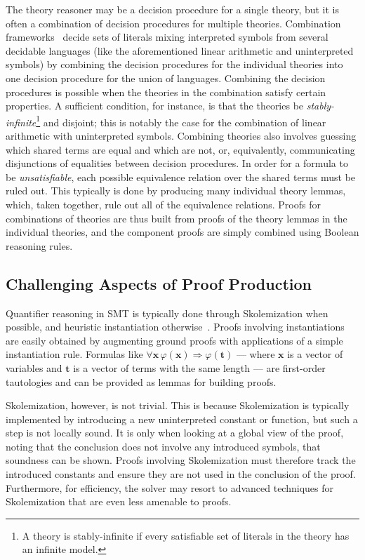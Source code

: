 \documentclass{llncs}
\begin{document}
The theory reasoner may be a decision procedure for a single theory, but it is often a
combination of decision procedures for multiple theories.  Combination
frameworks~\cite{Nelson3,Tinelli1} decide  sets of
literals mixing interpreted symbols from several decidable languages (like the
aforementioned linear arithmetic and uninterpreted symbols) by combining the
decision procedures for the individual theories into one decision
procedure for the union of languages.  Combining the decision procedures is possible
when the theories in the combination satisfy certain properties.  A sufficient
condition, for instance, is that the theories be \emph{stably-infinite}\footnote{A theory
  is stably-infinite if every satisfiable set of literals in the theory has an
  infinite model.} and disjoint; this is notably the case for the combination
of linear arithmetic with uninterpreted symbols.  Combining theories also
involves guessing which shared terms are equal and which are not, or,
equivalently, communicating disjunctions of equalities between decision
procedures.  In order for a formula to be \emph{unsatisfiable}, each
possible equivalence relation over the shared terms must be ruled out.  This
typically is done by producing many individual theory lemmas, which, taken
together, rule out all of the equivalence relations.  Proofs for combinations of
theories are thus built from proofs of the theory lemmas in the individual
theories, and the component proofs are simply combined using
Boolean reasoning rules.

\subsection{Challenging Aspects of Proof Production}

Quantifier reasoning in SMT is typically done through
Skolemization when possible, and heuristic instantiation
otherwise~\cite{Ge1,Moura9}.  Proofs involving instantiations are easily
obtained by augmenting ground proofs with applications of a simple
instantiation rule.  Formulas like $\forall \mathbf{x}\,
\varphi(\mathbf{x}) \Rightarrow \varphi(\mathbf{t})$ --- where $\mathbf{x}$ is a
vector of variables and $\mathbf{t}$ is a vector of terms with the same length
--- are first-order tautologies and can be provided as lemmas for building proofs.

Skolemization, however, is not trivial.  This is because Skolemization is
typically implemented by introducing a new uninterpreted constant or function,
but such a step %
is not locally sound.  It is only when looking at a global view
of the proof, noting that the conclusion does not involve any introduced
symbols, that soundness can be shown.  Proofs involving Skolemization must
therefore track the introduced constants and ensure they are not used
in the conclusion of the proof.  Furthermore, for efficiency, the solver may
resort to advanced techniques for Skolemization that are even less amenable to
proofs.
\end{document}
